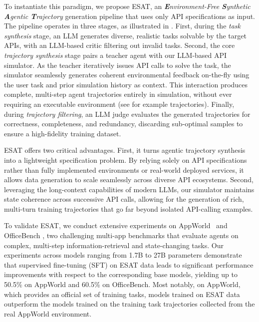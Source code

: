 To instantiate this paradigm, we propose \textsc{ESAT}, an \emph{\textbf{E}nvironment-Free \textbf{S}ynthetic \textbf{A}gentic \textbf{T}rajectory} generation pipeline that uses only API specifications as input. The pipeline operates in three stages, as illustrated in . First, during the \textit{task synthesis} stage, an LLM generates diverse, realistic tasks solvable by the target APIs, with an LLM-based critic filtering out invalid tasks. Second, the core \textit{trajectory synthesis} stage pairs a teacher agent with our LLM-based API simulator. As the teacher iteratively issues API calls to solve the task, the simulator seamlessly generates coherent environmental feedback on-the-fly using the user task and prior simulation history as context. This interaction produces complete, multi-step agent trajectories entirely in simulation, without ever requiring an executable environment (see  for example trajectories). Finally, during \textit{trajectory filtering}, an LLM judge evaluates the generated trajectories for correctness, completeness, and redundancy, discarding sub-optimal samples to ensure a high-fidelity training dataset.

\textsc{ESAT} offers two critical advantages. First, it turns agentic trajectory synthesis into a lightweight specification problem. By relying solely on API specifications rather than fully implemented environments or real-world deployed services, it allows data generation to scale seamlessly across diverse API ecosystems. Second, leveraging the long-context capabilities of modern LLMs, our simulator maintains state coherence across successive API calls, allowing for the generation of rich, multi-turn training trajectories that go far beyond isolated API-calling examples.

To validate \textsc{ESAT}, we conduct extensive experiments on AppWorld~\citep{appworld} and OfficeBench \citep{wang2024officebench}, two challenging multi-app benchmarks that evaluate agents on complex, multi-step information-retrieval and state-changing tasks. Our experiments across models ranging from 1.7B to 27B parameters demonstrate that supervised fine-tuning (SFT) on \textsc{ESAT} data leads to significant performance improvements with respect to the corresponding base models, yielding up to 50.5\% on AppWorld and 60.5\% on OfficeBench. Most notably, on AppWorld, which provides an official set of training tasks, models trained on \textsc{ESAT} data outperform the models trained on the training task trajectories collected from the real AppWorld environment.

